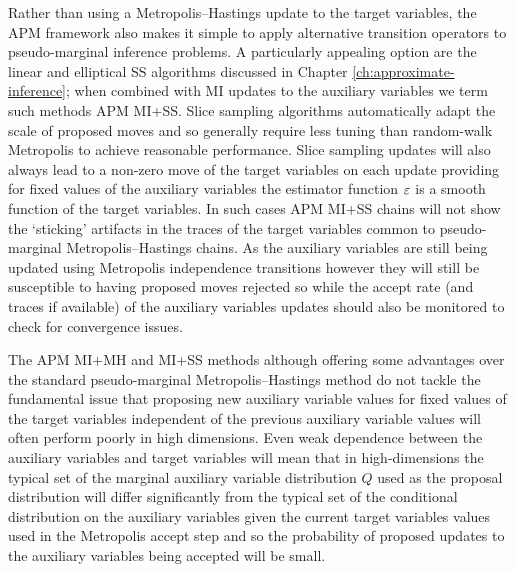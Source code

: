 Rather than using a Metropolis--Hastings update to the target variables, the \ac{APM} framework also makes it simple to apply alternative transition operators to pseudo-marginal inference problems. A particularly appealing option are the linear and elliptical \ac{SS} algorithms discussed in Chapter \ref{ch:approximate-inference}; when combined with \ac{MI} updates to the auxiliary variables we term such methods \ac{APM} \ac{MI}+\ac{SS}. Slice sampling algorithms automatically adapt the scale of proposed moves and so generally require less tuning than random-walk Metropolis to achieve reasonable performance. Slice sampling updates will also always lead to a non-zero move of the target variables on each update providing for fixed values of the auxiliary variables the estimator function $\varepsilon$ is a smooth function of the target variables. In such cases \ac{APM} \ac{MI}+\ac{SS} chains will not show the `sticking' artifacts in the traces of the target variables common to pseudo-marginal Metropolis--Hastings chains. As the auxiliary variables are still being updated using Metropolis independence transitions however they will still be susceptible to having proposed moves rejected so while the accept rate (and traces if available) of the auxiliary variables updates should also be monitored to check for convergence issues. %
	
The \ac{APM} \ac{MI}+\ac{MH} and \ac{MI}+\ac{SS} methods although offering some advantages over the standard pseudo-marginal Metropolis--Hastings method do not tackle the fundamental issue that proposing new auxiliary variable values for fixed values of the target variables independent of the previous auxiliary variable values will often perform poorly in high dimensions. Even weak dependence between the auxiliary variables and target variables will mean that in high-dimensions the typical set of the  marginal auxiliary variable distribution $Q$ used as the proposal distribution will differ significantly from the typical set of the conditional distribution on the auxiliary variables given the current target variables values used in the Metropolis accept step and so the probability of proposed updates to the auxiliary variables being accepted will be small. 


